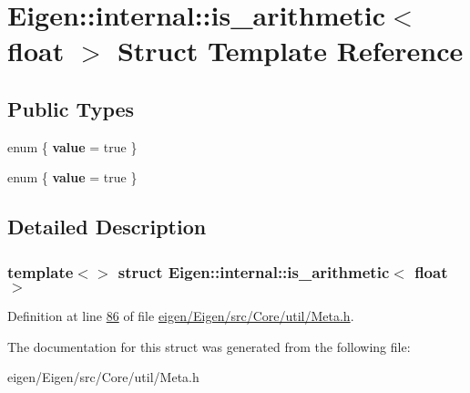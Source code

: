 \hypertarget{struct_eigen_1_1internal_1_1is__arithmetic_3_01float_01_4}{}\section{Eigen\+:\+:internal\+:\+:is\+\_\+arithmetic$<$ float $>$ Struct Template Reference}
\label{struct_eigen_1_1internal_1_1is__arithmetic_3_01float_01_4}
\subsection*{Public Types}
\begin{DoxyCompactItemize}
\item 
\mbox{\label{struct_eigen_1_1internal_1_1is__arithmetic_3_01float_01_4_adb7dae34733ae9b9ddb4c703722f34d9}} 
enum \{ {\bfseries value} = true
 \}
\item 
\mbox{\label{struct_eigen_1_1internal_1_1is__arithmetic_3_01float_01_4_a1e6f0c071290dbe8ef73fbd3c59eb94b}} 
enum \{ {\bfseries value} = true
 \}
\end{DoxyCompactItemize}


\subsection{Detailed Description}
\subsubsection*{template$<$$>$\newline
struct Eigen\+::internal\+::is\+\_\+arithmetic$<$ float $>$}



Definition at line \hyperlink{eigen_2_eigen_2src_2_core_2util_2_meta_8h_source_l00086}{86} of file \hyperlink{eigen_2_eigen_2src_2_core_2util_2_meta_8h_source}{eigen/\+Eigen/src/\+Core/util/\+Meta.\+h}.



The documentation for this struct was generated from the following file\+:\begin{DoxyCompactItemize}
\item 
eigen/\+Eigen/src/\+Core/util/\+Meta.\+h\end{DoxyCompactItemize}
